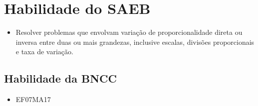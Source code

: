 \section*{Habilidade do SAEB}
\begin{itemize}
\item Resolver problemas que envolvam variação de
proporcionalidade direta ou inversa entre duas ou mais grandezas,
inclusive escalas, divisões proporcionais e taxa de variação.
\end{itemize}

\subsection{Habilidade da BNCC}
\begin{itemize}
\item EF07MA17
\end{itemize}


